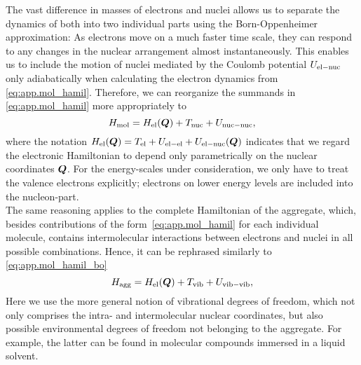 The vast difference in masses of electrons and nuclei allows us to separate the dynamics of both into two individual parts using the Born-Oppenheimer approximation:
As electrons move on a much faster time scale, they can respond to any changes in the nuclear arrangement almost instantaneously.
This enables us to include the motion of nuclei mediated by the Coulomb potential $U_\mathrm{el-nuc}$ only adiabatically when calculating the electron dynamics from \autoref{eq:app.mol_hamil}.
Therefore, we can reorganize the summands in \autoref{eq:app.mol_hamil} more appropriately to
\begin{equation}
  H_\mathrm{mol} = H_\mathrm{el}(\boldsymbol{Q}) + T_\mathrm{nuc} + U_\mathrm{nuc-nuc},
  \label{eq:app.mol_hamil_bo}
\end{equation}
where the notation $H_\mathrm{el}(\boldsymbol{Q}) = T_\mathrm{el} + U_\mathrm{el-el} + U_\mathrm{el-nuc}(\boldsymbol{Q})$ indicates that we regard the electronic Hamiltonian to depend only parametrically on the nuclear coordinates $\boldsymbol{Q}$.
For the energy-scales under consideration, we only have to treat the valence electrons explicitly; electrons on lower energy levels are included into the  nucleon-part.\\



The same reasoning applies to the complete Hamiltonian of the aggregate, which, besides contributions of the form~\ref{eq:app.mol_hamil} for each individual molecule, contains intermolecular interactions between electrons and nuclei in all possible combinations.
Hence, it can be rephrased similarly to \autoref{eq:app.mol_hamil_bo}
\begin{equation}
  H_\mathrm{agg} = H_\mathrm{el}(\boldsymbol{Q}) + T_\mathrm{vib} + U_\mathrm{vib-vib},
  \label{eq:app.agg_hamil}
\end{equation}
Here we use the more general notion of vibrational degrees of freedom, which not only comprises the intra- and intermolecular nuclear coordinates, but also possible environmental degrees of freedom not belonging to the aggregate.
For example, the latter can be found in molecular compounds immersed in a liquid solvent.


